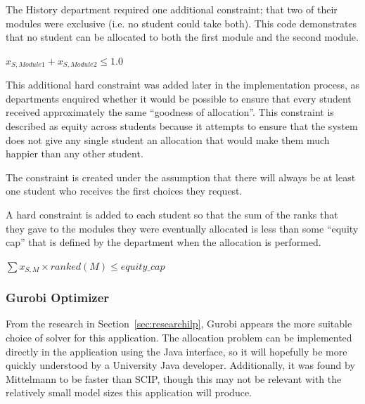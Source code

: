 
The History department required one additional constraint; that two of their
modules were exclusive (i.e. no student could take both). This code
demonstrates that no student can be allocated to both the first module and the
second module.

\begin{spacing}{1.6}
\begin{algorithmic}
  \STATE $x_{S,Module1} + x_{S,Module2} \leq 1.0$
\ENDFOR
\end{algorithmic}
\end{spacing}


This additional hard constraint was added later in the implementation process,
as departments enquired whether it would be possible to ensure that every
student received approximately the same ``goodness of allocation''. This
constraint is described as equity across students because it attempts to
ensure that the system does not give any single student an allocation that
would make them much happier than any other student.

The constraint is created under the assumption that there will always be at
least one student who receives the first choices they request.

A hard constraint is added to each student so that the sum of the ranks that
they gave to the modules they were eventually allocated is less than some
``equity cap'' that is defined by the department when the allocation is
performed.

\begin{spacing}{1.6}
\begin{algorithmic}
  \STATE $\displaystyle\sum x_{S,M} \times ranked(M) \leq equity\_cap$
\ENDFOR
\end{algorithmic}
\end{spacing}

\subsubsection{Gurobi Optimizer}

From the research in Section~\ref{sec:researchilp}, Gurobi appears the more
suitable choice of solver for this application. The allocation problem can be
implemented directly in the application using the Java interface, so it will
hopefully be more quickly understood by a University Java developer.
Additionally, it was found by Mittelmann to be faster than SCIP, though this
may not be relevant with the relatively small model sizes this application
will produce.

